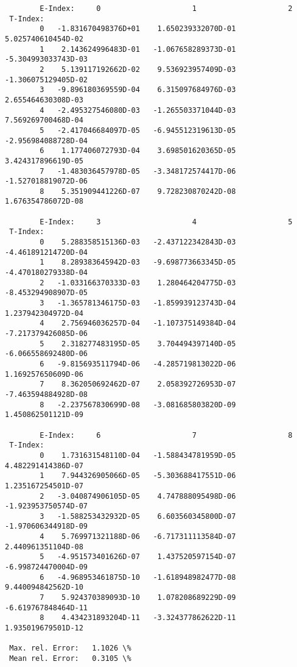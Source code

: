 \documentclass[12pt,dvipdfmx]{article}
\begin{document}
{\begin{small}\begin{verbatim}
        E-Index:     0                     1                     2
 T-Index:
        0   -1.831670498376D+01    1.650239332070D-01    5.025740610454D-02
        1    2.143624996483D-01   -1.067658289373D-01   -5.304993033743D-03
        2    5.139117192662D-02    9.536923957409D-03   -1.306075129405D-02
        3   -9.896180369559D-04    6.315097684976D-03    2.655464630308D-03
        4   -2.495327546080D-03   -1.265503371044D-03    7.569269700468D-04
        5   -2.417046684097D-05   -6.945512319613D-05   -2.956984088728D-04
        6    1.177406072793D-04    3.698501620365D-05    3.424317896619D-05
        7   -1.483036457978D-05   -3.348172574417D-06   -1.527018819072D-06
        8    5.351909441226D-07    9.728230870242D-08    1.676354786072D-08

        E-Index:     3                     4                     5
 T-Index:
        0    5.288358515136D-03   -2.437122342843D-03   -4.461891214720D-04
        1    8.289383645942D-03   -9.698773663345D-05   -4.470180279338D-04
        2   -1.033166370333D-03    1.280464204775D-03   -8.453294908907D-05
        3   -1.365781346175D-03   -1.859939123743D-04    1.237942304972D-04
        4    2.756946036257D-04   -1.107375149384D-04   -7.217379426085D-06
        5    2.318277483195D-05    3.704494397140D-05   -6.066558692480D-06
        6   -9.815693511794D-06   -4.285719813022D-06    1.169257650609D-06
        7    8.362050692462D-07    2.058392726953D-07   -7.463594884928D-08
        8   -2.237567830699D-08   -3.081685803820D-09    1.450862501121D-09

        E-Index:     6                     7                     8
 T-Index:
        0    1.731631548110D-04   -1.588434781959D-05    4.482291414386D-07
        1    7.944326905066D-05   -5.303688417551D-06    1.235167254501D-07
        2   -3.040874906105D-05    4.747888095498D-06   -1.923953750574D-07
        3   -1.588253432932D-05    6.603560345800D-07   -1.970606344918D-09
        4    5.769971321188D-06   -6.717311113584D-07    2.440961351104D-08
        5   -4.951573401626D-07    1.437520597154D-07   -6.998724470004D-09
        6   -4.968953461875D-10   -1.618948982477D-08    9.440094842562D-10
        7    5.924370389093D-10    1.078208689229D-09   -6.619767848464D-11
        8    4.434231893204D-11   -3.324377862622D-11    1.935019679501D-12

 Max. rel. Error:   1.1026 \%
 Mean rel. Error:   0.3105 \%


\end{verbatim}
\end{small}}
\end{document}

